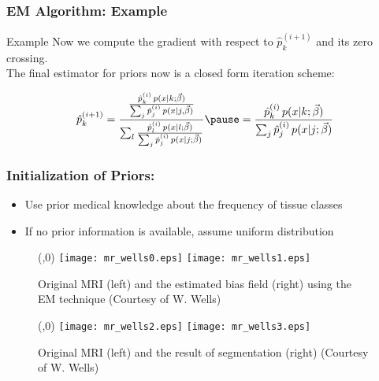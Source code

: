 \begin{frame}
  \frametitle{EM Algorithm: Example \cont}

  \begin{ovalblock}{Example \cont}
    \small
    Now we compute the gradient with respect to $\hat{p}_k^{(i+1)}$ and its zero crossing.\\
    The final estimator for priors now is a closed form iteration scheme:
   
   \begin{displaymath}
     \hat{p}_k^{(i+1)} = 
     \frac{
       \frac{\hat{p}_k^{(i)} \, p(x|k; \BiasField)}
            {\sum_{j}\hat{p}_j^{(i)} \, p(x|j, \BiasField)}
     }{
       \sum_l \frac{\hat{p}_l^{(i)} \, p(x|l; \BiasField)}
                   {\sum_j \hat{p}_j^{(i)} \, p(x|j; \BiasField)}
     } \pause =  
     \frac{\hat{p}_k^{(i)} \, p(x|k; \BiasField)}
          {\sum_j \hat{p}_j^{(i)} \, p(x|j; \BiasField)}
    \end{displaymath}
  \end{ovalblock}
\end{frame}


\begin{frame}
  \frametitle{Initialization of Priors:}

  \begin{itemize}
   \item Use prior medical knowledge about the frequency of tissue classes \\[.5cm]
   \item If no prior information is available, assume uniform distribution
  \end{itemize}
\end{frame}

\iffalse
\fi
\iffalse

\begin{figure}
  \centerline{\psscaleboxto(\linewidth,0){%
   \texttt{[image: mr\_wells0.eps]}
   \texttt{[image: mr\_wells1.eps]}
  }}
 \caption[MRI enhancement \cite{IMG-Wells}]
   {Original MRI (left) and the estimated bias field (right)
          using the EM technique
         (Courtesy of W. Wells)}\label{f:mr:enhance}
\end{figure}

\begin{figure}
  \centerline{\psscaleboxto(\linewidth,0){%
   \texttt{[image: mr\_wells2.eps]}
   \texttt{[image: mr\_wells3.eps]}
  }}
 \caption[MRI segmentation \cite{IMG-Wells}]
   {Original MRI (left) and the result of segmentation (right)
         (Courtesy of W. Wells)}\label{f:mr:segm}
\end{figure}

